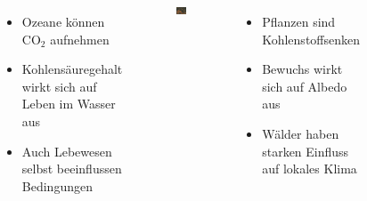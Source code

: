 \begin{frame}
\begin{columns}
\begin{figure}
		\end{figure}
			\begin{itemize}
				\item Ozeane können CO$_2$ aufnehmen
				\item Kohlensäuregehalt wirkt sich auf Leben im Wasser aus
				\item Auch Lebewesen selbst beeinflussen Bedingungen
			\end{itemize}
		\begin{figure}
			\centering
			\includegraphics[trim={0cm 0cm 0cm 3.8cm}, clip, width=\linewidth]{bilder/baeume}
		\end{figure}
			\begin{itemize}
				\item Pflanzen sind Kohlenstoffsenken
				\item Bewuchs wirkt sich auf Albedo aus
				\item Wälder haben starken Einfluss auf lokales Klima
			\end{itemize}
	\end{columns}

\end{frame}
